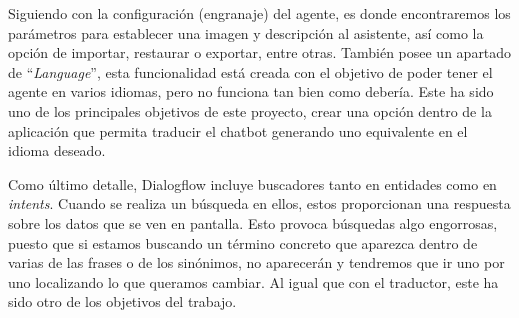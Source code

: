 Siguiendo con la configuración (engranaje) del agente, es donde encontraremos los parámetros para establecer una imagen y descripción al asistente, así como la opción de importar, restaurar o exportar, entre otras. También posee un apartado de ``\textit{Language}'', esta funcionalidad está creada con el objetivo de poder tener el agente en varios idiomas, pero no funciona tan bien como debería. Este ha sido uno de los principales objetivos de este proyecto, crear una opción dentro de la aplicación que permita traducir el chatbot generando uno equivalente en el idioma deseado.


Como último detalle, Dialogflow incluye buscadores tanto en entidades como en \textit{intents}. Cuando se realiza un búsqueda en ellos, estos proporcionan una respuesta sobre los datos que se ven en pantalla. Esto provoca búsquedas algo engorrosas, puesto que si estamos buscando un término concreto que aparezca dentro de varias de las frases o de los sinónimos, no aparecerán y tendremos que ir uno por uno localizando lo que queramos cambiar. Al igual que con el traductor, este ha sido otro de los objetivos del trabajo.
